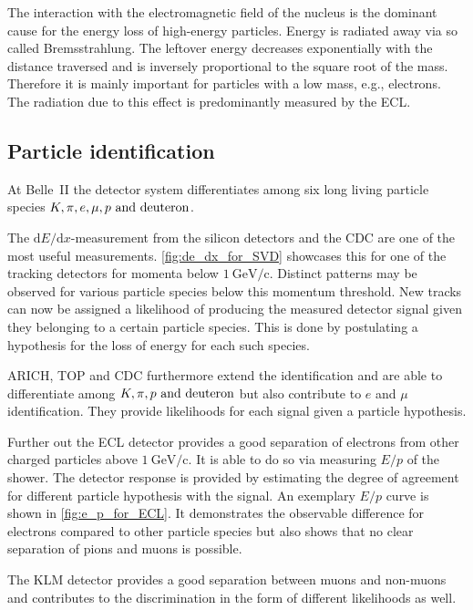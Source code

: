 The interaction with the electromagnetic field of the nucleus is the dominant cause for the energy loss of high-energy particles. Energy is radiated away via so called Bremsstrahlung. The leftover energy decreases exponentially with the distance traversed and is inversely proportional to the square root of the mass. Therefore it is mainly important for particles with a low mass, e.g., electrons. The radiation due to this effect is predominantly measured by the ECL.

\subsection{Particle identification}
\label{sec:particle_identification}

At Belle~\RN{2} the detector system differentiates among six long living particle species $K, \pi, e, \mu, p \text{ and } \hbox{deuteron}$.

The $\mathrm{d}E/\mathrm{d}x$-measurement from the silicon detectors and the CDC are one of the most useful measurements. \autoref{fig:de_dx_for_SVD} showcases this for one of the tracking detectors for momenta below $1 \mathrm{~GeV/c}$. Distinct patterns may be observed for various particle species below this momentum threshold.
New tracks can now be assigned a likelihood of producing the measured detector signal given they belonging to a certain particle species. This is done by postulating a hypothesis for the loss of energy for each such species.

ARICH, TOP and CDC furthermore extend the identification and are able to differentiate among $K, \pi, p \text{ and } \hbox{deuteron}$ but also contribute to $e$ and $\mu$ identification. They provide likelihoods for each signal given a particle hypothesis.

Further out the ECL detector provides a good separation of electrons from other charged particles above $1 \mathrm{~GeV/c}$. It is able to do so via measuring $E/p$ of the shower. The detector response is provided by estimating the degree of agreement for different particle hypothesis with the signal. An exemplary $E/p$ curve is shown in \autoref{fig:e_p_for_ECL}. It demonstrates the observable difference for electrons compared to other particle species but also shows that no clear separation of pions and muons is possible.

The KLM detector provides a good separation between muons and non-muons and contributes to the discrimination in the form of different likelihoods as well.

